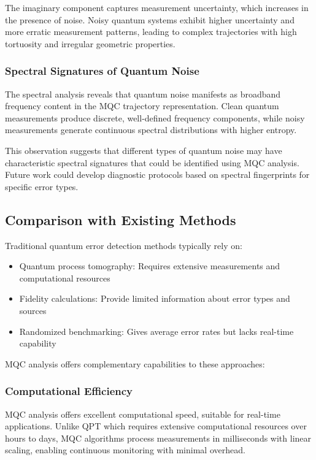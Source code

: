 The imaginary component captures measurement uncertainty, which increases in the presence of noise. Noisy quantum systems exhibit higher uncertainty and more erratic measurement patterns, leading to complex trajectories with high tortuosity and irregular geometric properties.

\subsubsection{Spectral Signatures of Quantum Noise}
The spectral analysis reveals that quantum noise manifests as broadband frequency content in the MQC trajectory representation. Clean quantum measurements produce discrete, well-defined frequency components, while noisy measurements generate continuous spectral distributions with higher entropy.

This observation suggests that different types of quantum noise may have characteristic spectral signatures that could be identified using MQC analysis. Future work could develop diagnostic protocols based on spectral fingerprints for specific error types.

\subsection{Comparison with Existing Methods}

Traditional quantum error detection methods typically rely on:
\begin{itemize}
\item Quantum process tomography: Requires extensive measurements and computational resources
\item Fidelity calculations: Provide limited information about error types and sources
\item Randomized benchmarking: Gives average error rates but lacks real-time capability
\end{itemize}

MQC analysis offers complementary capabilities to these approaches:

\subsubsection{Computational Efficiency}
MQC analysis offers excellent computational speed, suitable for real-time applications. Unlike QPT which requires extensive computational resources over hours to days, MQC algorithms process measurements in milliseconds with linear scaling, enabling continuous monitoring with minimal overhead.

